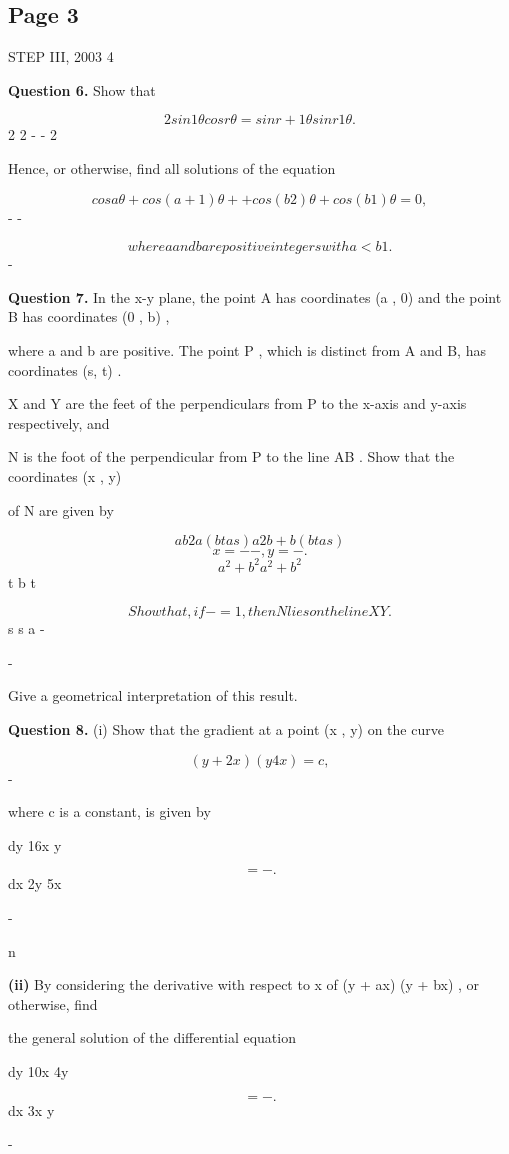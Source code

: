 \documentclass[12pt]{article}
\begin{document}
\subsection*{Page 3}
\begin{flushleft}
STEP III, 2003 4\par
\bigskip\textbf{Question 6.} Show that\par
\[2 sin 1 θ cos rθ = sin r + 1 θ sin r 1 θ .\]
2 2 - - 2\par
Hence, or otherwise, find all solutions of the equation\par
\[cos aθ + cos(a + 1)θ + + cos(b 2)θ + cos(b 1)θ = 0 ,\]
\cdots - -\par
\[where a and b are positive integers with a < b 1 .\]
-\par
\bigskip\textbf{Question 7.} In the x-y plane, the point A has coordinates (a , 0) and the point B has coordinates (0 , b) ,\par
where a and b are positive. The point P , which is distinct from A and B, has coordinates (s, t) .\par
X and Y are the feet of the perpendiculars from P to the x-axis and y-axis respectively, and\par
N is the foot of the perpendicular from P to the line AB . Show that the coordinates (x , y)\par
of N are given by\par
\[ab2 a(bt as) a2b + b(bt as)\]
\[x = - - , y = - .\]
\[a^2 + b^2 a^2 + b^2\]
t b t\par
\[Show that, if - = 1 , then N lies on the line XY .\]
\lambda s \mu \lambda s a \mu -\par
-\par
Give a geometrical interpretation of this result.\par
\bigskip\textbf{Question 8.} (i) Show that the gradient at a point (x , y) on the curve\par
\[(y + 2x) (y 4x) = c ,\]
-\par
where c is a constant, is given by\par
dy 16x y\par
\[= - .\]
dx 2y 5x\par
-\par
n\par
\textbf{(ii)} By considering the derivative with respect to x of (y + ax) (y + bx) , or otherwise, find\par
the general solution of the differential equation\par
dy 10x 4y\par
\[= - .\]
dx 3x y\par
-\par
\end{flushleft}
\end{document}
